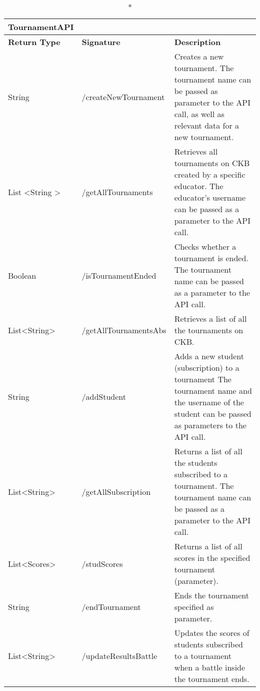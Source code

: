 	\begin{longtable}{|p{2.5cm} p{6.5cm} p{4.5cm}|}
		\caption*{TournamentAPI}\\ 
		
		\hline
		\textbf{Return Type} & \textbf{Signature} & \textbf{Description}\\
		\hline \endhead
	
		
		String &/createNewTournament &Creates a new tournament. The tournament name can be passed as parameter to the API call, as well as relevant data for a new tournament.\\
		
		List \textless String \textgreater & /getAllTournaments & Retrieves all tournaments on CKB created by a specific educator. The educator's username can be passed as a parameter to the API call.\\
		
		Boolean & /isTournamentEnded & Checks whether a tournament is ended. The tournament name can be passed as a parameter to the API call.\\
		
		List\textless String\textgreater & /getAllTournamentsAbs & Retrieves a list of all the tournaments on CKB.\\
		
		String &/addStudent & Adds a new student (subscription) to a tournament The tournament name and the username of the student can be passed as parameters to the API call.\\
		
		List\textless String\textgreater & /getAllSubscription & Returns a list of all the students subscribed to a tournament. The tournament name can be passed as a parameter to the API call.\\
		
		List\textless Scores\textgreater & /studScores & Returns a list of all scores in the specified tournament (parameter).\\
		
		String & /endTournament & Ends the tournament specified as parameter.\\
		
		List\textless String\textgreater & /updateResultsBattle & Updates the scores of students subscribed to a tournament when a battle inside the tournament ends.\\
		
		\hline
		
	\end{longtable}


